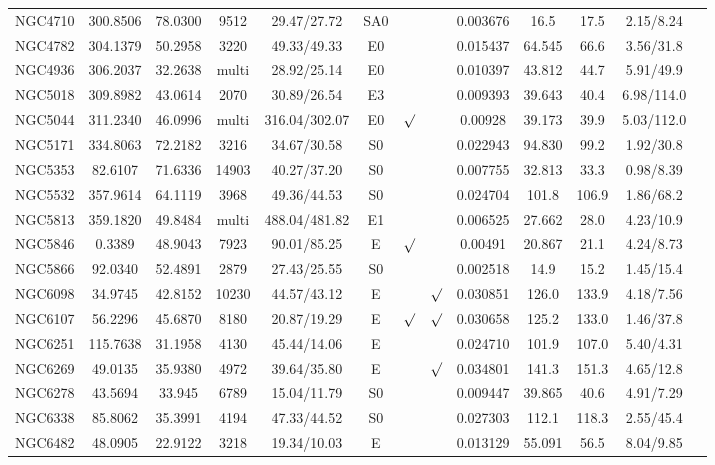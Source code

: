 \documentclass[iop]{emulateapj}
\begin{document}
\begin{table}
\begin{tabular}{lcccccccccccc}
NGC4710 & 300.8506 & 78.0300 & 9512  & 29.47/27.72 & SA0 &      &   & 0.003676 & 16.5 & 17.5 & 2.15/8.24 \\
NGC4782 & 304.1379 & 50.2958 & 3220 & 49.33/49.33 & E0 &        &  & 0.015437 & 64.545 & 66.6 & 3.56/31.8  \\
NGC4936 & 306.2037 & 32.2638 & multi  & 28.92/25.14  & E0 &     &      & 0.010397 & 43.812 & 44.7  & 5.91/49.9  \\
NGC5018 & 309.8982 & 43.0614 & 2070  & 30.89/26.54  & E3 &      &     & 0.009393 & 39.643 & 40.4 & 6.98/114.0  \\  
NGC5044 & 311.2340 & 46.0996 & multi & 316.04/302.07 & E0   & $\surd$& & 0.00928  & 39.173 & 39.9  & 5.03/112.0  \\
NGC5171 & 334.8063 & 72.2182 & 3216  & 34.67/30.58 & S0 &    &       & 0.022943 & 94.830 & 99.2 & 1.92/30.8  \\
NGC5353 & 82.6107 & 71.6336 & 14903 & 40.27/37.20 & S0 &      &      & 0.007755 & 32.813 & 33.3 & 0.98/8.39  \\
NGC5532 & 357.9614 & 64.1119 & 3968 & 49.36/44.53 & S0  &      &     & 0.024704 & 101.8 & 106.9 & 1.86/68.2  \\
NGC5813 & 359.1820 & 49.8484 & multi & 488.04/481.82 & E1 &      &  & 0.006525 & 27.662 & 28.0 & 4.23/10.9  \\
NGC5846 & 0.3389   & 48.9043 &  7923 & 90.01/85.25 & E  & $\surd$& & 0.00491  & 20.867 & 21.1  & 4.24/8.73  \\
NGC5866 & 92.0340 & 52.4891 & 2879  & 27.43/25.55  & S0 &    &     & 0.002518 & 14.9 & 15.2 & 1.45/15.4 \\
NGC6098 & 34.9745 & 42.8152 & 10230 & 44.57/43.12 & E &       &$\surd$  & 0.030851 & 126.0 & 133.9 & 4.18/7.56  \\
NGC6107 & 56.2296 & 45.6870 & 8180  & 20.87/19.29 & E & $\surd$ &$\surd$& 0.030658 & 125.2 & 133.0 & 1.46/37.8  \\
NGC6251 & 115.7638 & 31.1958 & 4130 & 45.44/14.06 & E &     &      & 0.024710 & 101.9 & 107.0 & 5.40/4.31  \\
NGC6269 & 49.0135 & 35.9380 & 4972 & 39.64/35.80 & E &       &$\surd$     & 0.034801 & 141.3 & 151.3 & 4.65/12.8  \\
NGC6278 & 43.5694 & 33.945 & 6789  & 15.04/11.79 & S0 &     &      & 0.009447 & 39.865 & 40.6 & 4.91/7.29 \\
NGC6338 & 85.8062 & 35.3991 & 4194 & 47.33/44.52 & S0 &      &     & 0.027303 & 112.1 & 118.3 & 2.55/45.4  \\
NGC6482 & 48.0905 & 22.9122 & 3218 & 19.34/10.03 & E &        &    & 0.013129 & 55.091 & 56.5 & 8.04/9.85  \\

\end{tabular}
\end{table}
\end{document}
